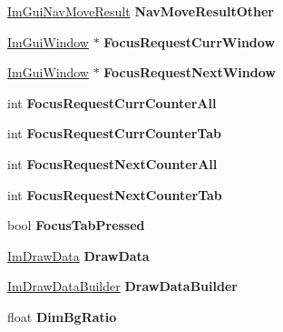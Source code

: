 \begin{DoxyCompactItemize}
\hyperlink{structImGuiNavMoveResult}{Im\+Gui\+Nav\+Move\+Result} {\bfseries Nav\+Move\+Result\+Other}
\item 
\mbox{\label{structImGuiContext_a51cbdb581415ae80a938da3f66a39071}} 
\hyperlink{structImGuiWindow}{Im\+Gui\+Window} $\ast$ {\bfseries Focus\+Request\+Curr\+Window}
\item 
\mbox{\label{structImGuiContext_afdc3d2f7926af72dcc60fb5d6b1f566b}} 
\hyperlink{structImGuiWindow}{Im\+Gui\+Window} $\ast$ {\bfseries Focus\+Request\+Next\+Window}
\item 
\mbox{\label{structImGuiContext_ae93027c01cc6fb58a8085014bee1f822}} 
int {\bfseries Focus\+Request\+Curr\+Counter\+All}
\item 
\mbox{\label{structImGuiContext_a7598173cd157248704a2196e12fbe6e7}} 
int {\bfseries Focus\+Request\+Curr\+Counter\+Tab}
\item 
\mbox{\label{structImGuiContext_a380cb97ab466c0e94d42c34e9b51e9f6}} 
int {\bfseries Focus\+Request\+Next\+Counter\+All}
\item 
\mbox{\label{structImGuiContext_a59101b3e09fa7e980f1670182d669c7c}} 
int {\bfseries Focus\+Request\+Next\+Counter\+Tab}
\item 
\mbox{\label{structImGuiContext_a07e3847a60cf6b72379b580bd39f4286}} 
bool {\bfseries Focus\+Tab\+Pressed}
\item 
\mbox{\label{structImGuiContext_ac52ed6f3c516266f2c7a1e393693349b}} 
\hyperlink{structImDrawData}{Im\+Draw\+Data} {\bfseries Draw\+Data}
\item 
\mbox{\label{structImGuiContext_a73b17849eb0d2d1d5848493c6762e5a8}} 
\hyperlink{structImDrawDataBuilder}{Im\+Draw\+Data\+Builder} {\bfseries Draw\+Data\+Builder}
\item 
\mbox{\label{structImGuiContext_af5761a79ad40a0b0fbdb1376ce0af4a1}} 
float {\bfseries Dim\+Bg\+Ratio}
\item 
\mbox{\label{structImGuiContext_a4134d419bad1e87ca359381b7cfbcd87}} 

\end{DoxyCompactItemize}
